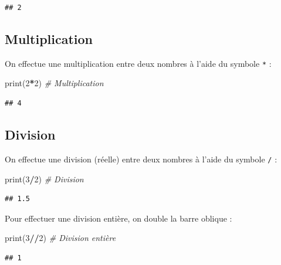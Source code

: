 \documentclass[12pt,]{book}
\newenvironment{Shaded}{\begin{snugshade}}{\end{snugshade}}
\newcommand{\DecValTok}[1]{\textcolor[rgb]{0.00,0.00,0.81}{#1}}
\newcommand{\CommentTok}[1]{\textcolor[rgb]{0.56,0.35,0.01}{\textit{#1}}}
\newcommand{\OperatorTok}[1]{\textcolor[rgb]{0.81,0.36,0.00}{\textbf{#1}}}
\newcommand{\BuiltInTok}[1]{#1}
\newcommand{\NormalTok}[1]{#1}
\numberwithin{equation}{section}
\numberwithin{countremarque}{section}
\begin{document}
\begin{lstlisting}
## 2
\end{lstlisting}

\subsection{Multiplication}\label{multiplication}

On effectue une multiplication entre deux nombres à l'aide du symbole
\texttt{*} :

\begin{Shaded}
\begin{Highlighting}[]
\BuiltInTok{print}\NormalTok{(}\DecValTok{2}\OperatorTok{*}\DecValTok{2}\NormalTok{) }\CommentTok{# Multiplication}
\end{Highlighting}
\end{Shaded}

\begin{lstlisting}
## 4
\end{lstlisting}

\subsection{Division}\label{division}

On effectue une division (réelle) entre deux nombres à l'aide du symbole
\texttt{/} :

\begin{Shaded}
\begin{Highlighting}[]
\BuiltInTok{print}\NormalTok{(}\DecValTok{3}\OperatorTok{/}\DecValTok{2}\NormalTok{) }\CommentTok{# Division}
\end{Highlighting}
\end{Shaded}

\begin{lstlisting}
## 1.5
\end{lstlisting}

Pour effectuer une division entière, on double la barre oblique :

\begin{Shaded}
\begin{Highlighting}[]
\BuiltInTok{print}\NormalTok{(}\DecValTok{3}\OperatorTok{//}\DecValTok{2}\NormalTok{) }\CommentTok{# Division entière}
\end{Highlighting}
\end{Shaded}

\begin{lstlisting}
## 1
\end{lstlisting}
\end{document}

